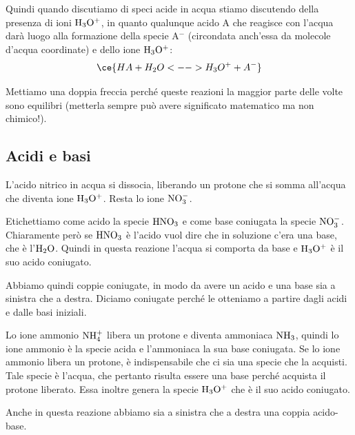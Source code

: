 \vspace{0.2cm}Quindi quando discutiamo di speci acide in acqua stiamo discutendo della presenza di ioni $\rm H_3O^+$, in quanto qualunque acido A che reagisce con l'acqua darà luogo alla formazione della specie A$^-$ (circondata anch'essa da molecole d'acqua coordinate) e dello ione $\rm H_3O^+$:
$$\ce{HA + H_2O <--> H_3O^+ + A^-}$$

Mettiamo una doppia freccia perché queste reazioni la maggior parte delle volte sono equilibri (metterla sempre può avere significato matematico ma non chimico!).
\subsection{Acidi e basi}

\vspace{0.2cm}

\vspace{0.2cm}L'acido nitrico in acqua si dissocia, liberando un protone che si somma all'acqua che diventa ione $\rm H_3O^+$. Resta lo ione $\rm NO_3^-$.

Etichettiamo come acido la specie $\rm HNO_3$ e come base coniugata la specie $\rm NO_3^-$. Chiaramente però se $\rm HNO_3$ è l'acido vuol dire che in soluzione c'era una base, che è l'$\rm H_2O$. Quindi in questa reazione l'acqua si comporta da base e $\rm H_3O^+$ è il suo acido coniugato.

Abbiamo quindi coppie coniugate, in modo da avere un acido e una base sia a sinistra che a destra. Diciamo coniugate perché le otteniamo a partire dagli acidi e dalle basi iniziali.

\vspace{0.2cm}

\vspace{0.2cm}Lo ione ammonio $\rm NH_4^+$ libera un protone e diventa ammoniaca $\rm NH_3$, quindi lo ione ammonio è la specie acida e l'ammoniaca la sua base coniugata. Se lo ione ammonio libera un protone, è indispensabile che ci sia una specie che la acquisti. Tale specie è l'acqua, che pertanto risulta essere una base perché acquista il protone liberato. Essa inoltre genera la specie $\rm H_3O^+$ che è il suo acido coniugato.

Anche in questa reazione abbiamo sia a sinistra che a destra una coppia acido-base.

\vspace{0.2cm}

